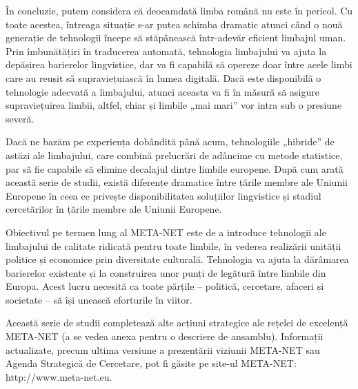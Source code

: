 \begin{multicols}{2}
În concluzie, putem considera că deocamdată limba română nu este în pericol. Cu toate acestea, întreaga situație s-ar putea schimba dramatic atunci când o nouă generație de tehnologii începe să stăpânească într-adevăr eficient limbajul uman. Prin îmbunătățiri în traducerea automată, tehnologia limbajului va ajuta la depășirea barierelor lingvistice, dar va fi capabilă să opereze doar între acele limbi care au reușit să supraviețuiască în lumea digitală. Dacă este disponibilă o tehnologie adecvată a limbajului, atunci aceasta va fi în măsură să asigure supraviețuirea limbii, altfel, chiar și limbile „mai mari” vor intra sub o presiune severă.\vspace*{0.09 cm}


Dacă ne bazăm pe experiența dobândită până acum, tehnologiile „hibride” de astăzi ale limbajului, care combină prelucrări de adâncime cu metode statistice, par să fie capabile să elimine decalajul dintre limbile europene. După cum arată această serie de studii, există diferențe dramatice între țările membre ale Uniunii Europene în ceea ce privește disponibilitatea soluțiilor lingvistice și stadiul cercetărilor în țările membre ale Uniunii Europene.

Obiectivul pe termen lung al \mbox{META-NET} este de a introduce tehnologii ale limbajului de calitate ridicată pentru toate limbile, în vederea realizării unității politice și economice prin diversitate culturală. Tehnologia va ajuta la dărâmarea barierelor existente și la construirea unor punți de legătură între limbile din Europa. Acest lucru necesită ca toate părțile -- politică, cercetare, afaceri și societate -- să își unească eforturile în viitor.

Această serie de studii completează alte acțiuni strategice ale rețelei de excelență META-NET (a se vedea anexa pentru o descriere de ansamblu). Informații actualizate, precum ultima versiune a prezentării viziunii META-NET \cite{Meta1} sau Agenda Strategică de Cercetare, pot fi găsite pe \mbox{site-ul} META-NET: http://www.meta-net.eu.
\end{multicols}

\clearpage


